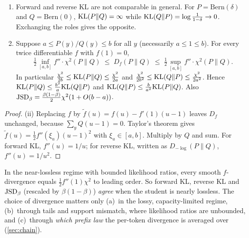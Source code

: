\begin{proposition}\label{prop:local}
\Pv\Ck
\begin{enumerate}[label=(\roman*),nosep]
\item Forward and reverse KL are not comparable in general. For $P=\mathrm{Bern}(\delta)$ and
$Q=\mathrm{Bern}(0)$, $\mathrm{KL}(P\|Q)=\infty$ while $\mathrm{KL}(Q\|P)=\log\frac1{1-\delta}\to0$. Exchanging the
roles gives the opposite.
\item Suppose $a\le P(y)/Q(y)\le b$ for all $y$ (necessarily $a\le1\le b$). For every twice
differentiable $f$ with $f(1)=0$,
\[
\tfrac12\inf_{[a,b]}f''\cdot\chi^2(P\|Q)\;\le\;D_f(P\|Q)\;\le\;\tfrac12\sup_{[a,b]}f''\cdot\chi^2(P\|Q).
\]
In particular $\frac{\chi^2}{2b}\le\mathrm{KL}(P\|Q)\le\frac{\chi^2}{2a}$ and
$\frac{\chi^2}{2b^2}\le\mathrm{KL}(Q\|P)\le\frac{\chi^2}{2a^2}$. Hence $\mathrm{KL}(P\|Q)\le\frac{b^2}{a}\mathrm{KL}(Q\|P)$ and
$\mathrm{KL}(Q\|P)\le\frac{b}{a^2}\mathrm{KL}(P\|Q)$. Also $\mathrm{JSD}_\beta=\frac{\beta(1-\beta)}2\chi^2(1+O(b-a))$.
\end{enumerate}
\end{proposition}
\begin{proof}
(ii) Replacing $f$ by $\tilde f(u)=f(u)-f'(1)(u-1)$ leaves $D_f$ unchanged, because $\sum_yQ(u-1)=0$.
Taylor's theorem gives $\tilde f(u)=\frac12f''(\xi_u)(u-1)^2$ with $\xi_u\in[a,b]$. Multiply by $Q$ and sum.
For forward KL, $f''(u)=1/u$; for reverse KL, written as $D_{-\log}(P\|Q)$, $f''(u)=1/u^2$.
\end{proof}

\begin{remark}\label{rem:local}
In the near-lossless regime with bounded likelihood ratios, every smooth $f$-divergence equals
$\frac12f''(1)\chi^2$ to leading order. So forward KL, reverse KL and $\mathrm{JSD}_\beta$ (rescaled by
$\beta(1-\beta)$) \emph{agree} when the student is nearly lossless. The choice of divergence matters
only (a)~in the lossy, capacity-limited regime, (b)~through tails and support mismatch, where likelihood
ratios are unbounded, and (c)~through \emph{which prefix law} the per-token divergence is averaged over
(\cref{sec:chain}).
\end{remark}

